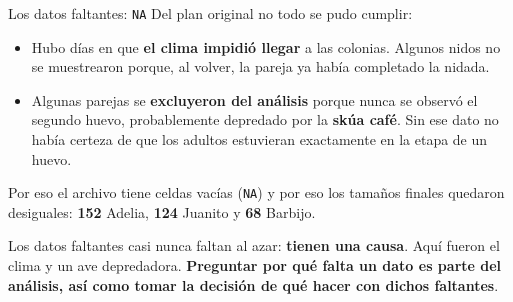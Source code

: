 \documentclass[aspectratio=169,10pt]{beamer}
\newcommand{\destaca}[1]{%
  \par\vspace{3pt}\noindent
  \colorbox{azulClaro}{%
    \parbox{\dimexpr\linewidth-2\fboxsep\relax}{\vspace{3pt}#1\vspace{3pt}}}%
  \par\vspace{3pt}}
\begin{document}
\begin{frame}{Los datos faltantes: \texttt{NA}}
  Del plan original no todo se pudo cumplir:
  \vspace{0.35cm}
  \begin{itemize}
    \item Hubo días en que \textbf{el clima impidió llegar} a las colonias. Algunos nidos
      no se muestrearon porque, al volver, la pareja ya había completado la nidada.
    \item Algunas parejas se \textbf{excluyeron del análisis} porque nunca se observó el
      segundo huevo, probablemente depredado por la \textbf{skúa café}. Sin ese dato no
      había certeza de que los adultos estuvieran exactamente en la etapa de un huevo.
  \end{itemize}

  \vspace{0.4cm}
  \destaca{Por eso el archivo tiene celdas vacías (\texttt{NA}) y por eso los tamaños
  finales quedaron desiguales: \textbf{152} Adelia, \textbf{124} Juanito y \textbf{68} Barbijo.

  \vspace{0.25cm}
  Los datos faltantes casi nunca faltan al azar: \textbf{tienen una causa}. Aquí fueron
  el clima y un ave depredadora. \textbf{Preguntar por qué falta un dato es parte del análisis, así como tomar la decisión de qué hacer con dichos faltantes}.}
\end{frame}
\end{document}
